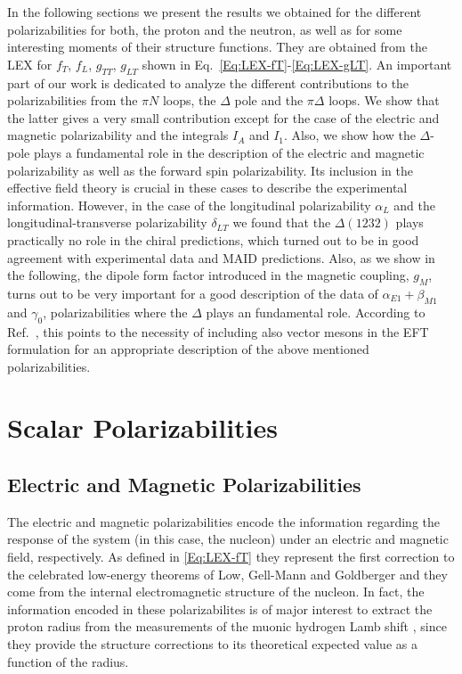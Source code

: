 \documentclass[prc,twocolumn,showpacs,preprintnumbers,amsmath,amssymb
,superscriptaddress,a4paper,nofootinbib
]{revtex4-1}
\begin{document}
In the following sections we present the results we obtained for the different polarizabilities for both, the proton and the neutron, as well as for some interesting moments of their structure functions.
They are obtained from the LEX for $f_T$, $f_L$, $g_{TT}$, $g_{LT}$ shown in Eq.~\eqref{Eq:LEX-fT}-\eqref{Eq:LEX-gLT}.
An important part of our work is dedicated to analyze the different contributions to the polarizabilities from the $\pi N$ loops, the $\Delta$ pole and the $\pi\Delta$ loops.
We show that the latter gives a very small contribution except for the case of the electric and magnetic polarizability and the integrals $I_A$ and $I_1$.
Also, we show how the $\Delta$-pole plays a fundamental role in the description of the electric and magnetic polarizability as well as the forward spin polarizability. 
Its inclusion in the effective field theory is crucial in these cases to describe the experimental information. 
However, in the case of the longitudinal polarizability $\alpha_L$ and the longitudinal-transverse polarizability $\delta_{LT}$ we found that the $\Delta(1232)$ plays practically no role in the chiral predictions, which turned out to be in good agreement with experimental data and MAID predictions.
Also, as we show in the following, the dipole form factor introduced in the magnetic coupling, $g_M$, turns out to be very important for a good description of the data of $\alpha_{E1}+\beta_{M1}$ and $\gamma_0$, polarizabilities where the $\Delta$ plays an fundamental role. 
According to Ref.~\cite{Pascalutsa:2005vq}, this points to the necessity of including also vector mesons in the EFT formulation for an appropriate description of the above mentioned polarizabilities.
 

\section{Scalar Polarizabilities}
\label{Sec:Scalar-Pol}

\subsection{Electric and Magnetic Polarizabilities}

The electric and magnetic polarizabilities encode the information regarding the response of the system (in this case, the nucleon) under an electric and magnetic field, respectively.
As defined in \eqref{Eq:LEX-fT} they represent the first correction to the celebrated low-energy theorems of Low, Gell-Mann and Goldberger \cite{LET} and they come from the internal electromagnetic structure of the nucleon.
In fact, the information encoded in these polarizabilites is of major interest to extract the proton radius from the measurements of the muonic hydrogen Lamb shift \cite{Birse:2012eb,Alarcon:2013cba,Carlson:2011zd,Nevado:2007dd,Peset:2014yha}, since they provide the structure corrections to its theoretical expected value as a function of the radius.
\end{document}
